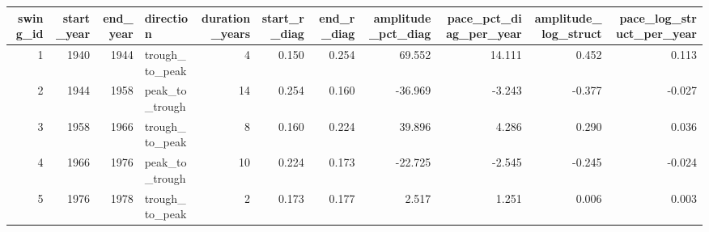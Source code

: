 
\begin{tabular}{rrrlrrrrrrr}
\toprule
swing_id & start_year & end_year & direction & duration_years & start_r_diag & end_r_diag & amplitude_pct_diag & pace_pct_diag_per_year & amplitude_log_struct & pace_log_struct_per_year\\
\midrule
1 & 1940 & 1944 & trough_to_peak & 4 & 0.150 & 0.254 & 69.552 & 14.111 & 0.452 & 0.113\\
2 & 1944 & 1958 & peak_to_trough & 14 & 0.254 & 0.160 & -36.969 & -3.243 & -0.377 & -0.027\\
3 & 1958 & 1966 & trough_to_peak & 8 & 0.160 & 0.224 & 39.896 & 4.286 & 0.290 & 0.036\\
4 & 1966 & 1976 & peak_to_trough & 10 & 0.224 & 0.173 & -22.725 & -2.545 & -0.245 & -0.024\\
5 & 1976 & 1978 & trough_to_peak & 2 & 0.173 & 0.177 & 2.517 & 1.251 & 0.006 & 0.003\\
\bottomrule
\end{tabular}

